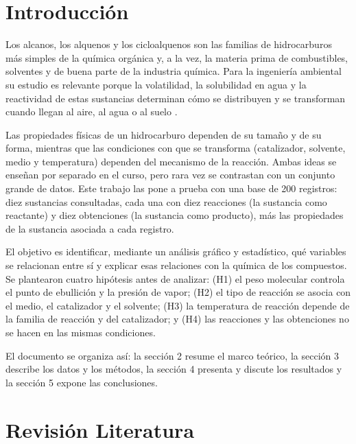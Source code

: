 \documentclass[twoside,twocolumn,10pt]{article}
\begin{document}
\section{Introducción}
\fontsize{12}{14}\selectfont
Los alcanos, los alquenos y los cicloalquenos son las familias de hidrocarburos m\'as simples de la qu\'imica org\'anica y, a la vez, la materia prima de combustibles, solventes y de buena parte de la industria qu\'imica. Para la ingenier\'ia ambiental su estudio es relevante porque la volatilidad, la solubilidad en agua y la reactividad de estas sustancias determinan c\'omo se distribuyen y se transforman cuando llegan al aire, al agua o al suelo \cite{Clayden2012,McMurry2016}.

Las propiedades f\'isicas de un hidrocarburo dependen de su tama\~no y de su forma, mientras que las condiciones con que se transforma (catalizador, solvente, medio y temperatura) dependen del mecanismo de la reacci\'on. Ambas ideas se ense\~nan por separado en el curso, pero rara vez se contrastan con un conjunto grande de datos. Este trabajo las pone a prueba con una base de 200 registros: diez sustancias consultadas, cada una con diez reacciones (la sustancia como reactante) y diez obtenciones (la sustancia como producto), m\'as las propiedades de la sustancia asociada a cada registro.

El objetivo es identificar, mediante un an\'alisis gr\'afico y estad\'istico, qu\'e variables se relacionan entre s\'i y explicar esas relaciones con la qu\'imica de los compuestos. Se plantearon cuatro hip\'otesis antes de analizar: (H1) el peso molecular controla el punto de ebullici\'on y la presi\'on de vapor; (H2) el tipo de reacci\'on se asocia con el medio, el catalizador y el solvente; (H3) la temperatura de reacci\'on depende de la familia de reacci\'on y del catalizador; y (H4) las reacciones y las obtenciones no se hacen en las mismas condiciones.

El documento se organiza as\'i: la secci\'on 2 resume el marco te\'orico, la secci\'on 3 describe los datos y los m\'etodos, la secci\'on 4 presenta y discute los resultados y la secci\'on 5 expone las conclusiones.

\section{Revisión Literatura}
\end{document}
